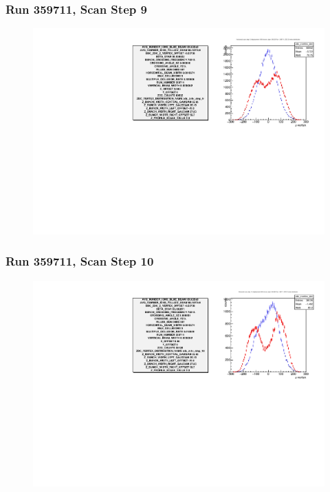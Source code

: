 \begin{frame}
\frametitle{Run 359711, Scan Step 9}
\begin{figure}
\begin{center}
\includegraphics[width=\linewidth]{"figs/359711_step_9_zdc_zvertex"}
\caption{ }
\label{fig:359711_step_9_zdc_zvertex}
\end{center}\end{figure}
\end{frame}

\begin{frame}
\frametitle{Run 359711, Scan Step 10}
\begin{figure}
\begin{center}
\includegraphics[width=\linewidth]{"figs/359711_step_10_zdc_zvertex"}
\caption{ }
\label{fig:359711_step_10_zdc_zvertex}
\end{center}\end{figure}
\end{frame}


